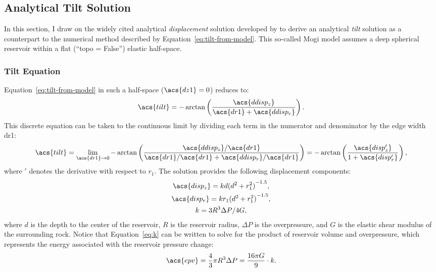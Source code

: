 \subsection{Analytical Tilt Solution}

In this section, I draw on the widely cited analytical \emph{displacement} solution developed by \textcite{mogi_relations_1958} to derive an analytical \emph{tilt} solution as a counterpart to the numerical method described by Equation~\eqref{eq:tilt-from-model}. This so-called Mogi model assumes a deep spherical reservoir within a flat (``topo = False'') elastic half-space.

\subsubsection{Tilt Equation}

Equation~\eqref{eq:tilt-from-model} in such a half-space ($\acs{dz1} = 0$) reduces to:
\begin{equation}
    \acs{tilt} = 
    -\arctan\left(\dfrac{\acs{ddisp_z}}{\acs{dr1}+\acs{ddisp_r}}\right).\label{eq:tilt-from-flat-model}
\end{equation}
This discrete equation can be taken to the continuous limit by dividing each term in the numerator and denominator by the edge width \acs{dr1}:
\begin{equation}
\acs{tilt}
    = \lim_{\acs{dr1}\to0} 
    -\arctan\left(\dfrac{\acs{ddisp_z}/\acs{dr1}}{\acs{dr1}/\acs{dr1}
    + \acs{ddisp_r}/\acs{dr1}}\right) = 
    -\arctan\left(\dfrac{\acs{disp_z'}}{1+\acs{disp_r'}}\right),\label{eq:analytical-tilt}
\end{equation}
where $'$ denotes the derivative with respect to $r_1$. The \textcite{mogi_relations_1958} solution provides the following displacement components:
\begin{gather}
    \acs{disp_z} = kd{(d^2+r_1^2)}^{-1.5},\label{eq:uz_mogi}\\
    \acs{disp_r} = kr_1{(d^2+r_1^2)}^{-1.5},\label{eq:ur_mogi}\\
    k = {3R^3\Delta P}/{4G},\label{eq:k}
\end{gather}
where $d$ is the depth to the center of the reservoir, $R$ is the reservoir radius, $\Delta P$ is the overpressure, and $G$ is the elastic shear modulus of the surrounding rock. Notice that Equation~\eqref{eq:k} can be written to solve for the product of reservoir volume and overpressure, which represents the energy associated with the reservoir pressure change:
\begin{equation}
    \acs{epv} = \frac{4}{3}\pi R^3\Delta P=\frac{16\pi G}{9} \cdot k.\label{eq:epv}
\end{equation}

